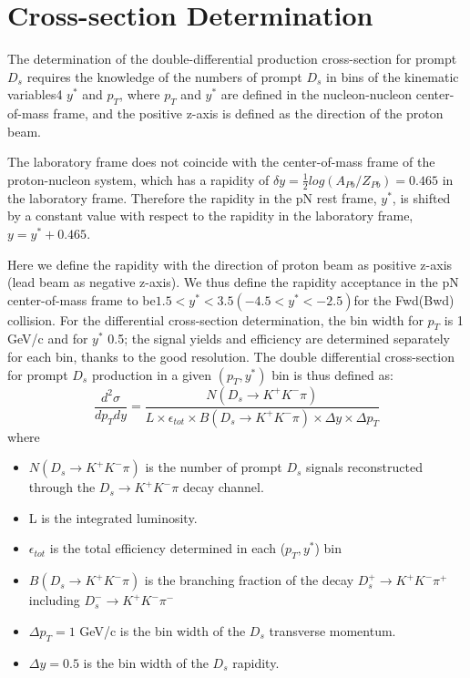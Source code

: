 \documentclass[
10pt, %
a4paper, %
oneside, %
headinclude,footinclude, %
BCOR5mm, %
]{scrartcl}
\begin{document}
\section{Cross-section Determination}
    The determination of the double-differential production cross-section for prompt $D_s$ requires the knowledge of the numbers of prompt $D_s$ in bins of the kinematic variables4 $y^{*}$ and $p_{T}$, where $p_T$ and $y^{*}$ are defined in the nucleon-nucleon center-of-mass frame, and the positive z-axis is defined as the direction of the proton beam.\par
    The laboratory frame does not coincide with the center-of-mass frame of the proton-nucleon system, which has a rapidity of $\delta y = \frac
{1}{2} log(A_{Pb}/Z_{Pb}) = 0.465$ in the laboratory frame. Therefore the rapidity in the pN rest frame, $y^{*}$, is shifted by a constant value with respect to the rapidity in the laboratory frame, $y = y^{*} + 0.465$.\par
Here we define the rapidity with the direction of proton beam as positive z-axis (lead beam as negative z-axis). We thus define the rapidity acceptance in the pN center-of-mass frame to be$1.5<y^{*} <3.5(-4.5<y^{*} <-2.5)$for the Fwd(Bwd) collision. For the differential cross-section determination, the bin width for $p_T$ is 1 GeV/c and for $y^{*}$ 0.5; the signal yields and efficiency are determined separately for each bin, thanks to the good resolution.
The double differential cross-section for prompt $D_s$ production in a given $(p_T,y^{*})$ bin is thus defined as:
\begin{equation}
\frac{d^2\sigma}{dp_Tdy}=\frac{N(D_s\rightarrow K^+K^-\pi)}{L\times \epsilon_{tot}\times B(D_s\rightarrow K^+K^-\pi)\times \Delta y\times \Delta p_T}
\end{equation}
where
\begin{itemize}
\item $N(D_s\rightarrow K^+K^-\pi)$ is the number of prompt $D_s$ signals reconstructed through the $D_s\rightarrow K^+K^-\pi$ decay channel.
\item L is the integrated luminosity.
\item $\epsilon_{tot}$ is the total efficiency determined in each ($p_T,y^{*}$) bin
\item $B(D_s\rightarrow K^+K^-\pi)$  is the branching fraction of the decay $D_s^+\rightarrow K^+K^-\pi^+$ including $D_s^-\rightarrow K^+K^-\pi^-$
\item $\Delta p_T = 1$ GeV/c is the bin width of the $D_s$ transverse momentum.
\item $\Delta y = 0.5$ is the bin width of the $D_s$ rapidity.
\end{itemize}
\end{document}
